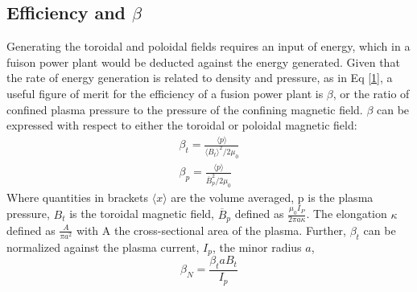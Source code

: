 \subsection{Efficiency and $\beta$}
Generating the toroidal and poloidal fields requires an input of energy, which in a fuison power plant would be deducted against the energy generated.  Given that the rate of energy generation is related to density and pressure, as in Eq \eqref{1}, a useful figure of merit for the efficiency of a fusion power plant is $\beta$, or the ratio of confined plasma pressure to the pressure of the confining magnetic field.  $\beta$ can be expressed with respect to either the toroidal or poloidal magnetic field:
\begin{eqnarray}	
\beta_t = \frac{\langle p \rangle}{\langle B_t \rangle^2/2\mu_0}\\
\beta_p = \frac{\langle p \rangle}{\overline{B}_p^2/2\mu_0}
\end{eqnarray}
Where quantities in brackets $\langle x \rangle$ are the volume averaged, p is the plasma pressure, $B_t$ is the toroidal magnetic field, $\overline{B}_p$ defined as $\frac{\mu_0 I_P}{2 \pi a \kappa}$. The elongation $\kappa$ defined as $\frac{A}{\pi a^2}$ with A the cross-sectional area of the plasma. Further, $\beta_t$ can be normalized against the plasma current, $I_p$, the minor radius $a$, \begin{equation}
\beta_N = \frac{\beta_t a B_t}{I_p}
\end{equation}